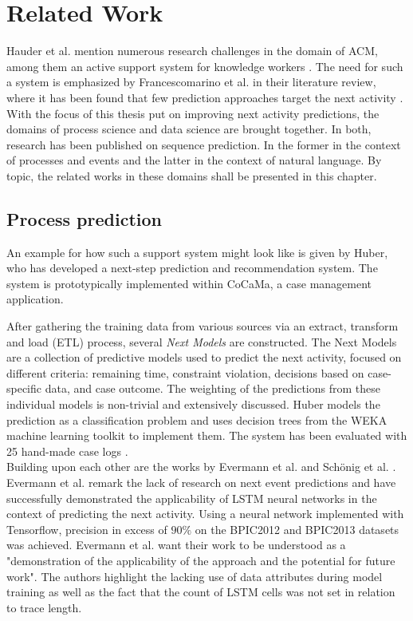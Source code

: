 \chapter{Related Work}\label{sec:related-work}
Hauder et al. mention numerous research challenges in the domain of ACM, among them an active support system for knowledge workers \cite{hauder2014}.
The need for such a system is emphasized by Francescomarino et al. in their literature review, where it has been found that few prediction approaches target the next activity \cite{francescomarino2018}.\\

With the focus of this thesis put on improving next activity predictions, the domains of process science and data science are brought together. In both, research has been published on sequence prediction. In the former in the context of processes and events and the latter in the context of natural language. By topic, the related works in these domains shall be presented in this chapter.

\section{Process prediction}
An example for how such a support system \cite{hauder2014} might look like is given by Huber, who has developed a next-step prediction and recommendation system. The system is prototypically implemented within CoCaMa, a case management application.

After gathering the training data from various sources via an extract, transform and load (ETL) process, several \textit{Next Models} are constructed. The Next Models are a collection of predictive models used to predict the next activity, focused on different criteria: remaining time, constraint violation, decisions based on case-specific data, and case outcome. The weighting of the predictions from these individual models is non-trivial and extensively discussed. Huber models the prediction as a classification problem and uses decision trees from the WEKA \cite{web:weka} machine learning toolkit to implement them. The system has been evaluated with 25 hand-made case logs \cite{huber2015}.\\

Building upon each other are the works by Evermann et al. \cite{evermann2016} and Schönig et al. \cite{schoenig2018}. Evermann et al. remark the lack of research on next event predictions and have successfully demonstrated the applicability of LSTM neural networks in the context of predicting the next activity. Using a neural network implemented with Tensorflow, precision in excess of $90\%$ on the BPIC2012 and BPIC2013 datasets was achieved. Evermann et al. want their work to be understood as a "demonstration of the applicability of the approach and the potential for future work". The authors highlight the lacking use of data attributes during model training as well as the fact that the count of LSTM cells was not set in relation to trace length.

